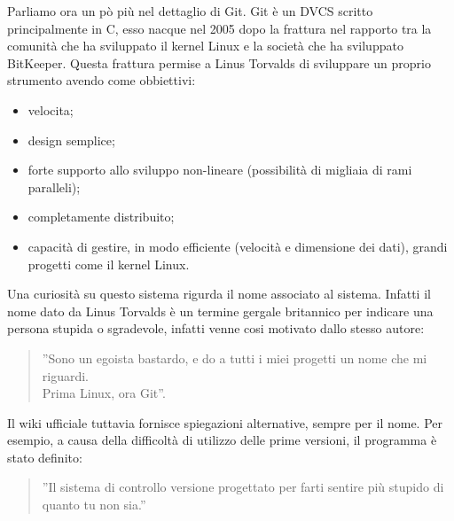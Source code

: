 Parliamo ora un pò più nel dettaglio di Git. Git è un DVCS scritto principalmente in C, esso nacque nel 2005 dopo la frattura nel rapporto tra la comunità che ha sviluppato il kernel Linux e la società che ha sviluppato BitKeeper. Questa frattura permise a Linus Torvalds di sviluppare un proprio strumento avendo come obbiettivi:

\begin{itemize}
\item velocita;
\item design semplice;
\item forte supporto allo sviluppo non-lineare (possibilità di migliaia di rami paralleli);
\item completamente distribuito;
\item capacità di gestire, in modo efficiente (velocità e dimensione dei dati), grandi progetti come il kernel Linux.
\end{itemize}

Una curiosità su questo sistema rigurda il nome associato al sistema. Infatti il nome dato da Linus Torvalds è un termine gergale britannico per indicare una persona stupida o sgradevole, infatti venne cosi motivato dallo stesso autore:

\begin{quotation}
''Sono un egoista bastardo, e do a tutti i miei progetti un nome che mi riguardi.\\Prima Linux, ora Git''.
\end{quotation}

Il wiki ufficiale tuttavia fornisce spiegazioni alternative, sempre per il nome. Per esempio, a causa della difficoltà di utilizzo delle prime versioni, il programma è stato definito:

\begin{quotation}
''Il sistema di controllo versione progettato per farti sentire più stupido di quanto tu non sia.''
\end{quotation}